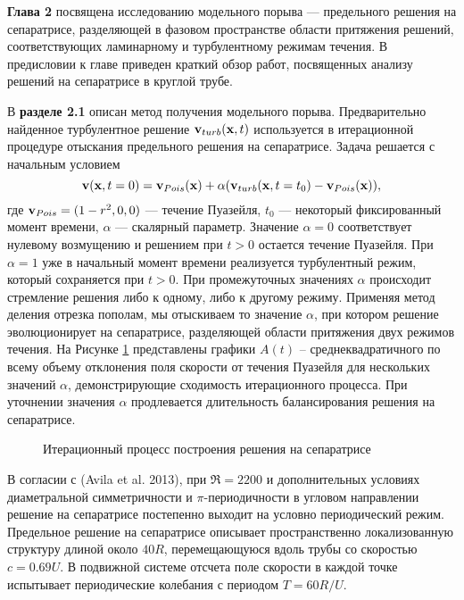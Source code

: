 \textbf{Глава 2} посвящена исследованию модельного порыва --- предельного решения на сепаратрисе, разделяющей в фазовом пространстве области притяжения решений, соответствующих ламинарному и турбулентному режимам течения. В предисловии к главе приведен краткий обзор работ, посвященных анализу решений на сепаратрисе в круглой трубе. 

В \textbf{разделе 2.1} описан метод получения модельного порыва. Предварительно найденное турбулентное решение $\mathbf{v}_{turb}(\mathbf{x},t)$ используется в итерационной процедуре отыскания предельного решения на сепаратрисе. Задача решается с начальным условием
\begin{equation} \label{edge_init_eq}
\mathbf{v}(\mathbf{x},t=0) = \mathbf{v}_{Pois}(\mathbf{x})+\alpha(\mathbf{v}_{turb}(\mathbf{x},t=t_0) - \mathbf{v}_{Pois}(\mathbf{x})),
\end{equation}
где $\mathbf{v}_{Pois}=(1-r^2,0,0)$ --- течение Пуазейля, $t_0$ --- некоторый фиксированный момент времени, $\alpha$ --- скалярный параметр. Значение $\alpha=0$ соответствует нулевому возмущению и решением при $t > 0$ остается течение Пуазейля. При $\alpha=1$ уже в начальный момент времени реализуется турбулентный режим, который сохраняется при $t > 0$. При промежуточных значениях $\alpha$ происходит стремление решения либо к одному, либо к другому режиму. Применяя метод деления отрезка пополам, мы отыскиваем то значение $\alpha$, при котором решение эволюционирует на сепаратрисе, разделяющей области притяжения двух режимов течения. На Рисунке \ref{bisection_pic} представлены графики $A(t)$ – среднеквадратичного по всему объему отклонения поля скорости от течения Пуазейля для нескольких значений $\alpha$, демонстрирующие сходимость итерационного процесса. При уточнении значения $\alpha$ продлевается длительность балансирования решения на сепаратрисе.

\begin{figure}
\caption{Итерационный процесс построения решения на сепаратрисе}
\label{bisection_pic}
\end{figure}

В согласии с (Avila et al. 2013), при $\Re=2200$ и дополнительных условиях диаметральной симметричности и $\pi$-периодичности в угловом направлении решение на сепаратрисе постепенно выходит на условно периодический режим. Предельное решение на сепаратрисе описывает пространственно локализованную структуру длиной около $40R$, перемещающуюся вдоль трубы со скоростью $c=0.69U$. В подвижной системе отсчета поле скорости в каждой точке испытывает периодические колебания с периодом $T=60R/U$. 

